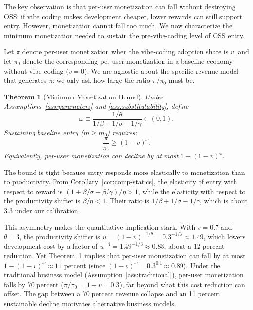 \documentclass[11pt,a4paper]{article}
\newtheorem{theorem}{Theorem}
\theoremstyle{definition}
\theoremstyle{remark}
\begin{document}
The key observation is that per-user monetization can fall without destroying OSS: if vibe coding makes development cheaper, lower rewards can still support entry. However, monetization cannot fall too much. We now characterize the minimum monetization needed to sustain the pre-vibe-coding level of OSS entry.

Let $\pi$ denote per-user monetization when the vibe-coding adoption share is $v$, and let $\pi_0$ denote the corresponding per-user monetization in a baseline economy without vibe coding ($v=0$). We are agnostic about the specific revenue model that generates $\pi$; we only ask how large the ratio $\pi/\pi_0$ must be.

\begin{theorem}[Minimum Monetization Bound]\label{thm:min-monetization}
Under Assumptions~\ref{ass:parameters} and \ref{ass:substitutability}, define
$$
\omega \equiv \frac{1/\theta}{1/\beta + 1/\sigma - 1/\gamma} \in (0,1).
$$
Sustaining baseline entry ($m \ge m_0$) requires:
\begin{equation}\label{eq:min-monetization}
\frac{\pi}{\pi_0} \ge (1-v)^\omega.
\end{equation}
Equivalently, per-user monetization can decline by at most $1-(1-v)^\omega$.
\end{theorem}

The bound is tight because entry responds more elastically to monetization than to productivity. From Corollary~\ref{cor:comp-statics}, the elasticity of entry with respect to reward is $(1 + \beta/\sigma - \beta/\gamma)/\eta > 1$, while the elasticity with respect to the productivity shifter is $\beta/\eta < 1$. Their ratio is $1/\beta + 1/\sigma - 1/\gamma$, which is about $3.3$ under our calibration.

This asymmetry makes the quantitative implication stark. With $v=0.7$ and $\theta=3$, the productivity shifter is $u=(1-v)^{-1/\theta}=0.3^{-1/3}\approx 1.49$, which lowers development cost by a factor of $u^{-\beta}=1.49^{-1/3}\approx 0.88$, about a 12 percent reduction. Yet Theorem~\ref{thm:min-monetization} implies that per-user monetization can fall by at most $1-(1-v)^\omega \approx 11$ percent (since $(1-v)^\omega = 0.3^{0.1} \approx 0.89$). Under the traditional business model (Assumption~\ref{ass:traditional}), per-user monetization falls by 70 percent ($\pi/\pi_0 = 1-v = 0.3$), far beyond what this cost reduction can offset. The gap between a 70 percent revenue collapse and an 11 percent sustainable decline motivates alternative business models.
\end{document}
